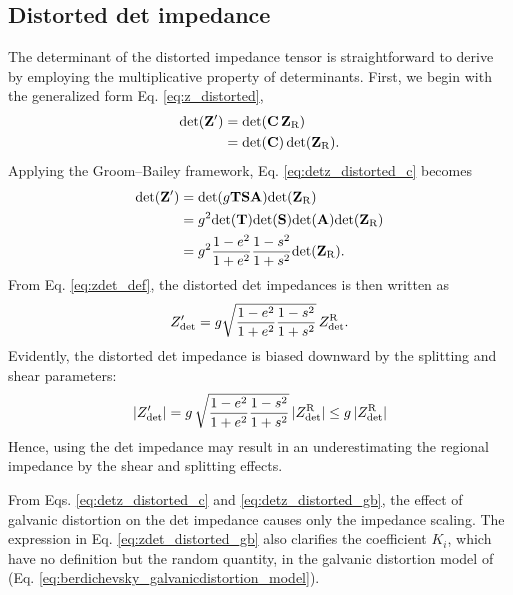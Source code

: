 \subsection{Distorted det impedance}
	 The determinant of the distorted impedance tensor is straightforward to derive by employing the multiplicative property of determinants. 
	First, we begin with the generalized form Eq. \eqref{eq:z_distorted}, 
		\begin{equation}\label{eq:detz_distorted_c}
			\begin{split}
				\det(\ZbfDistorted) & = \det(\Cbf\,\ZbfUndistorted) \\
								& = \det(\Cbf)\,\det(\ZbfUndistorted).
			\end{split}
		\end{equation}
	Applying the Groom--Bailey framework, Eq. \eqref{eq:detz_distorted_c} becomes
		\begin{equation}\label{eq:detz_distorted_gb}
			\begin{split}
				\det(\ZbfDistorted) & = \det(\gain\Tbf\Sbf\Abf)\det(\ZbfUndistorted) \\
				& = g^2 \det(\Tbf) \det(\Sbf) \det(\Abf) \det(\ZbfUndistorted) \\	
				& = g^2 \frac{1-e^2}{1+e^2} \frac{1-s^2}{1+s^2} \det(\ZbfUndistorted).
			\end{split}
		\end{equation}
	From Eq. \eqref{eq:zdet_def}, the distorted det impedances is then written as
	\begin{equation}\label{eq:zdet_distorted_gb}
		\ZdetDistorted = g\sqrt{\frac{1-e^2}{1+e^2} \frac{1-s^2}{1+s^2}}\,\ZdetUndistorted.
	\end{equation}
	Evidently, the distorted det impedance is biased downward by the splitting and shear parameters:
	\begin{equation}
		|Z_\text{det}'| = g\,\sqrt{\frac{1-e^2}{1+e^2} \frac{1-s^2}{1+s^2}}\,|Z_\text{det}^{\text{R}}| \le g\, |Z_\text{det}^{\text{R}}|
	\end{equation}
	Hence, using the det impedance may result in an underestimating the regional impedance by the shear and splitting effects.

	From Eqs. \eqref{eq:detz_distorted_c} and \eqref{eq:detz_distorted_gb}, the effect of galvanic distortion on the det impedance causes only the impedance scaling. 
	The expression in Eq. \eqref{eq:zdet_distorted_gb} also clarifies the coefficient $K_i$, which have no definition but the random quantity, in the galvanic distortion model of \citet{berdichevsky1980a} (Eq. \ref{eq:berdichevsky_galvanicdistortion_model}).
	
